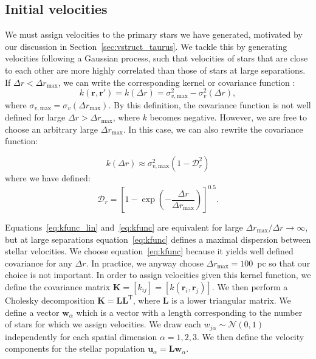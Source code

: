 \documentclass{aa}
\begin{document}
\subsection{Initial velocities}
\label{sec:velocities}

We must assign velocities to the primary stars we have generated, motivated by our discussion in Section~\ref{sec:vstruct_taurus}. We tackle this by generating velocities following a Gaussian process, such that velocities of stars that are close to each other are more highly correlated than those of stars at large separations. If $\Delta r < \Delta r_\mathrm{max} $, we can write the corresponding kernel or covariance function \citep[e.g. see equation~2.19 of][]{Rasmussen06}:
\begin{equation}
\label{eq:kfunc_lin}
    k(\bm{r},\bm{r'}) = k(\Delta r)  = \sigma_{v,\mathrm{max}}^2 - \sigma_v ^2 (\Delta r),
\end{equation}where $\sigma_{v,\mathrm{max}} = \sigma_{v}(\Delta r_\mathrm{max})$. By this definition, the covariance function is not well defined for large $\Delta r > \Delta r_\mathrm{max}$, where $k$ becomes negative. However, we  are free to choose an arbitrary large $\Delta r_\mathrm{max}$. In this case, we can also rewrite the covariance function: 
    
\begin{equation}
\label{eq:kfunc}
    k(\Delta r)  \approx \sigma_{v,\mathrm{max}}^2 \left( 1 - \mathcal{D}_r^2\right)
\end{equation}where we have defined:
\begin{equation}
    \mathcal{D}_r = \left[1- \exp\left(-\frac{\Delta r}{\Delta r_\mathrm{max}}\right) \right]^{0.5}.
\end{equation}

Equations~\ref{eq:kfunc_lin} and~\ref{eq:kfunc} are equivalent for large $\Delta r_\mathrm{max}/\Delta r\rightarrow \infty$, but at large separations equation~\ref{eq:kfunc} defines a maximal dispersion between stellar velocities. We choose equation~\ref{eq:kfunc} because it yields well defined covariance for any $\Delta r$. In practice, we anyway choose $\Delta r_\mathrm{max}=100$~pc so that our choice is not important.  In order to assign velocities given this kernel function, we define the covariance matrix $\bm{K} = [k_{ij}] = [k(\bm{r}_{i}, \bm{r}_{j})]$. We then perform a Cholesky decomposition $\bm{K} = \bm{L}\bm{L}^\mathrm{T}$, where \(\bm{L}\) is a lower triangular matrix. We define a vector $\bm{w}_{\alpha}$ which is a vector with a length corresponding to the number of stars for which we assign velocities. We draw each $w_{ j \alpha} \sim \mathcal{N}(0, 1)$ independently for each spatial dimension $\alpha=1, 2, 3$. We then define the velocity components for the stellar population $\bm{u}_{\alpha} = \bm{L}  \bm{w}_\alpha $.
\end{document}
